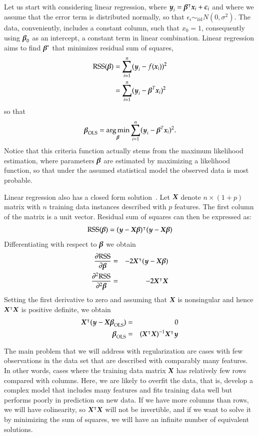\begin{refsection}

Let us start with considering linear regression, where $\boldsymbol{y}_i = \boldsymbol{\beta}^\intercal \boldsymbol{x}_i + \epsilon_i$ and where we assume that the error term is distributed normally, so that $\epsilon_i \sim_\text{iid} N(0, \sigma^2)$. The data, conveniently, includes a constant column, such that $x_0=1$, consequently using $\boldsymbol{\beta}_0$ as an intercept, a constant term in linear combination. Linear regression aims to find $\boldsymbol{\beta}^*$ that minimizes residual sum of squares,
\begin{align*}
{\rm RSS}(\boldsymbol{\beta}) & = \sum_{i=1}^n (\boldsymbol{y}_i-f(\boldsymbol{x}_i))^2 \\
& = \sum_{i=1}^n (\boldsymbol{y}_i - \boldsymbol{\beta}^T\boldsymbol{x}_i)^2 
\end{align*}
so that
$$\boldsymbol{\beta}_{\rm OLS} = \operatorname*{arg\,min}_{\boldsymbol{\beta}} \sum_{i=1}^n (\boldsymbol{y}_i - \boldsymbol{\beta}^T\boldsymbol{x}_i)^2.$$
Notice that this criteria function actually stems from the maximum likelihood estimation, where parameters $\boldsymbol{\beta}$ are estimated by maximizing a likelihood function, so that under the assumed statistical model the observed data is most probable.

Linear regression also has a closed form solution~\cite{ESL}. Let $\boldsymbol{X}$ denote $n\times (1+p)$ matrix with $n$ training data instances described with $p$ features. The first column of the matrix is a unit vector. Residual sum of squares can then be expressed as:
$$
{\rm RSS}(\boldsymbol{\beta}) = (\boldsymbol{y}-\boldsymbol{X}\boldsymbol{\beta})^\intercal (\boldsymbol{y}-\boldsymbol{X}\boldsymbol{\beta})
$$
Differentiating with respect to $\boldsymbol{\beta}$ we obtain 
\begin{eqnarray*}
\frac{\partial{\rm RSS}}{\partial \boldsymbol{\beta}} & = & -2\boldsymbol{X}^\intercal (\boldsymbol{y} - \boldsymbol{X}\boldsymbol{\beta}) \\
\frac{\partial^2{\rm RSS}}{\partial^2\boldsymbol{\beta}} & = & -2\boldsymbol{X}^\intercal\boldsymbol{X}
\end{eqnarray*}
Setting the first derivative to zero and assuming that $\boldsymbol{X}$ is nonsingular and hence $\boldsymbol{X}^\intercal\boldsymbol{X}$ is positive definite, we obtain
\begin{eqnarray*}
\boldsymbol{X}^\intercal (\boldsymbol{y} - \boldsymbol{X}\boldsymbol{\beta}_{\rm OLS}) & = & 0 \\
\boldsymbol{\beta}_{\rm OLS} & = & (\boldsymbol{X}^\intercal\boldsymbol{X})^{-1}\boldsymbol{X}^\intercal\boldsymbol{y}
\end{eqnarray*}

The main problem that we will address with regularization are cases with few observations in the data set that are described with comparably many features. In other words, cases where the training data matrix $\boldsymbol{X}$ has relatively few rows compared with columns. Here, we are likely to overfit the data, that is, develop a complex model that includes many features and fits training data well but performs poorly in prediction on new data. If we have more columns than rows, we will have colinearity, so $\boldsymbol{X}^\intercal\boldsymbol{X}$ will not be invertible, and if we want to solve it by minimizing the sum of squares, we will have an infinite number of equivalent solutions.


\end{refsection}
